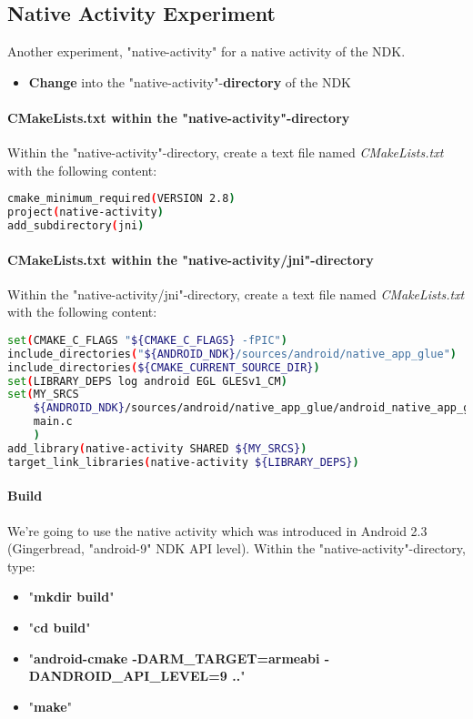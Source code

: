 \subsection{Native Activity Experiment}
Another experiment, "native-activity" for a native activity of the \ac{NDK}.

\begin{itemize}
\item{\textbf{Change} into the "native-activity"-\textbf{directory}} of the \ac{NDK}
\end{itemize}


\paragraph{CMakeLists.txt within the "native-activity"-directory}
Within the "native-activity"-directory, create a text file named \emph{CMakeLists.txt} with the following content:
\begin{lstlisting}[language=sh]
cmake_minimum_required(VERSION 2.8)
project(native-activity)
add_subdirectory(jni)
\end{lstlisting}


\paragraph{CMakeLists.txt within the "native-activity/jni"-directory}
Within the "native-activity/jni"-directory, create a text file named \emph{CMakeLists.txt} with the following content:
\begin{lstlisting}[language=sh]
set(CMAKE_C_FLAGS "${CMAKE_C_FLAGS} -fPIC")
include_directories("${ANDROID_NDK}/sources/android/native_app_glue")
include_directories(${CMAKE_CURRENT_SOURCE_DIR})
set(LIBRARY_DEPS log android EGL GLESv1_CM)
set(MY_SRCS
    ${ANDROID_NDK}/sources/android/native_app_glue/android_native_app_glue.c
    main.c
    )
add_library(native-activity SHARED ${MY_SRCS})
target_link_libraries(native-activity ${LIBRARY_DEPS})
\end{lstlisting}


\paragraph{Build}
We're going to use the native activity which was introduced in Android 2.3 (Gingerbread, "android-9" \ac{NDK} \ac{API} level). Within the "native-activity"-directory, type:
\begin{itemize}
\item{"\textbf{mkdir build}"}
\item{"\textbf{cd build}"}
\item{"\textbf{android-cmake -DARM\_TARGET=armeabi -DANDROID\_API\_LEVEL=9 ..}"}
\item{"\textbf{make}"}
\end{itemize}



